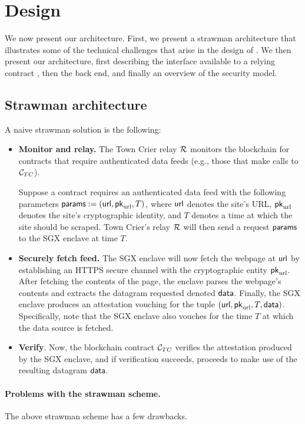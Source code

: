\section{\tc Design}

We now present our \tc architecture. First, we present a strawman architecture that illustrates some of the technical challenges that arise in the design of \tc. We then present our \tc architecture, first describing the interface available to a relying contract \reqcont, then the back end, and finally an overview of the security model.

\subsection{Strawman architecture}

A naive strawman solution is the following:
\begin{itemize}[leftmargin=5mm]
\item
{\bf Monitor and relay.}
The Town Crier relay $\mathcal{R}$    
monitors the blockchain for 
contracts that require authenticated data feeds (e.g., those
that make calls to ${\cal C}_{TC}$).

Suppose a contract requires 
an authenticated 
data feed with the following parameters ${\sf params} := ({{\sf url}}, {\sf pk}_{\textrm{url}}, T)$,
where ${{\sf url}}$ denotes the site's URL,
${\sf pk}_{\textrm{url}}$ denotes the site's cryptographic 
identity, and $T$ denotes a time at which the site should be scraped.
Town Crier's relay $\mathcal{R}$ will then send
a request ${\sf params}$ 
to the SGX enclave at time $T$.
\item
{\bf Securely fetch feed.}
The SGX enclave will now fetch the webpage at ${{\sf url}}$ by establishing
an HTTPS secure channel with 
the cryptographic entity ${\sf pk}_{\textrm{url}}$.
After fetching the contents of the page, 
the enclave parses the webpage's contents and extracts the datagram requested
denoted ${\sf data}$.
Finally, the SGX enclave produces an attestation 
vouching for the tuple $({{\sf url}}, {\sf pk}_{\textrm{url}}, T, {\sf data})$.
Specifically, note that the SGX enclave also vouches
for the time $T$ at which the data source is fetched.
\item
{\bf Verify}.
Now, the blockchain contract ${\cal C}_{TC}$ verifies the attestation
produced by the SGX enclave, and 
if verification succeeds, proceeds to make use of 
the resulting datagram ${\sf data}$.
\end{itemize}

\paragraph{Problems with the strawman scheme.}
The above strawman scheme has a few drawbacks. 

